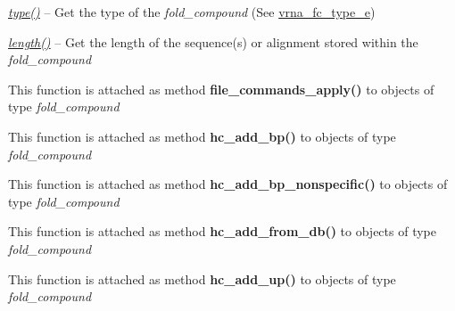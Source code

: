 \begin{DoxyRefList}
\begin{DoxyItemize}
\item {\itshape \hyperlink{group__fold__compound_ac5eab693deac9a1a40c2a95ac294707c}{type()}} -- Get the type of the {\itshape fold\+\_\+compound} (See \hyperlink{group__fold__compound_ga01a4ff86fa71deaaa5d1abbd95a1447d}{vrna\+\_\+fc\+\_\+type\+\_\+e})
\item {\itshape \hyperlink{group__fold__compound_a95fbfed770b858e50c766505dc4bf998}{length()}} -- Get the length of the sequence(s) or alignment stored within the {\itshape fold\+\_\+compound} 
\end{DoxyItemize}
\item[\label{wrappers__wrappers000002}%
\hypertarget{wrappers__wrappers000002}{}%
Global \hyperlink{commands_8h_adbe8c9622f7bcc6dcbe3448b98df8656}{vrna\+\_\+file\+\_\+commands\+\_\+apply} (vrna\+\_\+fold\+\_\+compound\+\_\+t $\ast$vc, const char $\ast$filename, unsigned int options)]This function is attached as method {\bfseries file\+\_\+commands\+\_\+apply()} to objects of type {\itshape fold\+\_\+compound}  
\item[\label{wrappers__wrappers000007}%
\hypertarget{wrappers__wrappers000007}{}%
Global \hyperlink{group__hard__constraints_gac49305fc5c7d8653c5fbd2de1e1615e2}{vrna\+\_\+hc\+\_\+add\+\_\+bp} (vrna\+\_\+fold\+\_\+compound\+\_\+t $\ast$vc, int i, int j, char option)]This function is attached as method {\bfseries hc\+\_\+add\+\_\+bp()} to objects of type {\itshape fold\+\_\+compound}  
\item[\label{wrappers__wrappers000006}%
\hypertarget{wrappers__wrappers000006}{}%
Global \hyperlink{group__hard__constraints_gadeb1083d0dc928e1e931065aae54ad82}{vrna\+\_\+hc\+\_\+add\+\_\+bp\+\_\+nonspecific} (vrna\+\_\+fold\+\_\+compound\+\_\+t $\ast$vc, int i, int d, char option)]This function is attached as method {\bfseries hc\+\_\+add\+\_\+bp\+\_\+nonspecific()} to objects of type {\itshape fold\+\_\+compound}  
\item[\label{wrappers__wrappers000008}%
\hypertarget{wrappers__wrappers000008}{}%
Global \hyperlink{group__hard__constraints_ga5b4de3247b67358080c176b94591a8e6}{vrna\+\_\+hc\+\_\+add\+\_\+from\+\_\+db} (vrna\+\_\+fold\+\_\+compound\+\_\+t $\ast$vc, const char $\ast$constraint, unsigned int options)]This function is attached as method {\bfseries hc\+\_\+add\+\_\+from\+\_\+db()} to objects of type {\itshape fold\+\_\+compound}  
\item[\label{wrappers__wrappers000005}%
\hypertarget{wrappers__wrappers000005}{}%
Global \hyperlink{group__hard__constraints_gaeb352e3e6ccd2b567bafa451365bb545}{vrna\+\_\+hc\+\_\+add\+\_\+up} (vrna\+\_\+fold\+\_\+compound\+\_\+t $\ast$vc, int i, char option)]This function is attached as method {\bfseries hc\+\_\+add\+\_\+up()} to objects of type {\itshape fold\+\_\+compound}  

\end{DoxyRefList}
